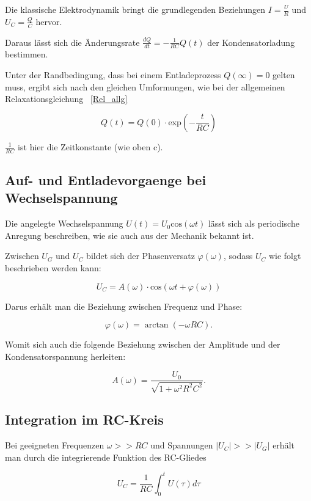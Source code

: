 Die klassische Elektrodynamik bringt die grundlegenden Beziehungen $I = \frac{U}{R}$ und $U_C = \frac{Q}{C}$ 
hervor.

Daraus lässt sich die Änderungsrate $\frac{dQ}{dt} = -\frac{1}{RC}Q(t)$ der Kondensatorladung bestimmen. 

Unter der Randbedingung, dass bei einem Entladeprozess $Q(\infty) = 0$ gelten muss, ergibt sich nach den gleichen
Umformungen, wie bei der allgemeinen Relaxationsgleichung ~\eqref{Rel_allg}

\begin{equation}
    \label{RelQ}
Q(t) = Q(0)\cdot \textrm{exp}(-\frac{t}{RC})
\end{equation}

$\frac{1}{RC}$ ist hier die Zeitkonstante (wie oben c).


\subsection{Auf- und Entladevorgaenge bei Wechselspannung}
\label{subsec:Entladevorgaenge bei Wechselspannung}

Die angelegte Wechselspannung $U(t) = U_0 \textrm{cos}(\omega t)$ lässt sich als periodische Anregung beschreiben, 
wie sie auch aus der Mechanik bekannt ist.

Zwischen $U_G$ und $U_C$ bildet sich der Phasenversatz $\varphi(\omega)$, sodass $U_C$ wie folgt beschrieben werden
kann:

\begin{equation}
    U_C = A(\omega) \cdot \textrm{cos}(\omega t + \varphi(\omega))
\end{equation}

Darus erhält man die Beziehung zwischen Frequenz und Phase:

\begin{equation}
    \label{PhiArctan}
    \varphi\left(\omega\right)=\arctan\left(-\omega RC\right).
\end{equation}

Womit sich auch die folgende Beziehung zwischen der Amplitude und der Kondensatorspannung herleiten:

\begin{equation}
    \label{eqn:bezAU}
    A\left(\omega\right) = \frac{U_0}{\sqrt{1+\omega^2R^2C^2}}.
\end{equation}

\subsection{Integration im RC-Kreis}
\label{subsec:Integration im RC-Kreis}

Bei geeigneten Frequenzen $\omega >> RC$ und Spannungen $|U_C| >> |U_G|$ erhält man durch die integrierende Funktion des RC-Gliedes 

\begin{equation}
    \label{integrator}
    U_C = \frac{1}{RC} \int_{0}^{t} U(\tau) d\tau
\end{equation}

